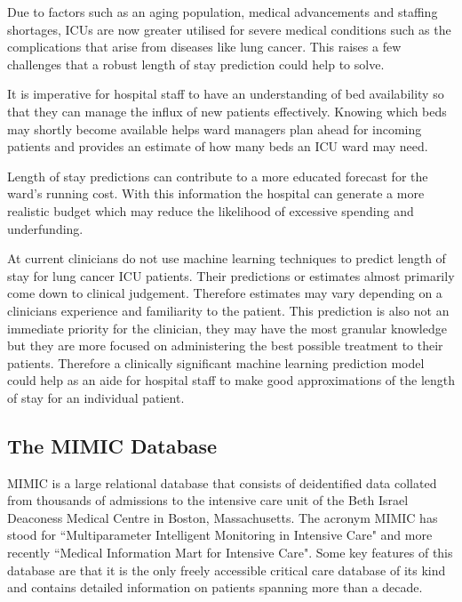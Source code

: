 \documentclass[11pt]{article}
\begin{document}
Due to factors such as an aging population, medical advancements and staffing shortages, ICUs are now greater utilised for severe medical conditions such as the complications that arise from diseases like lung cancer\cite{Halpern2016}. This raises a few challenges that a robust length of stay prediction could help to solve.

It is imperative for hospital staff to have an understanding of bed availability so that they can manage the influx of new patients effectively. Knowing which beds may shortly become available helps ward managers plan ahead for incoming patients and provides an estimate of how many beds an ICU ward may need. 

Length of stay predictions can contribute to a more educated forecast for the ward's running cost. With this information the hospital can generate a more realistic budget which may reduce the likelihood of excessive spending and underfunding.

At current clinicians do not use machine learning techniques to predict length of stay for lung cancer ICU patients. Their predictions or estimates almost primarily come down to clinical judgement. Therefore estimates may vary depending on a clinicians experience and familiarity to the patient. This prediction is also not an immediate priority for the clinician, they may have the most granular knowledge but they are more focused on administering the best possible treatment to their patients. Therefore a clinically significant machine learning prediction model could help as an aide for hospital staff to make good approximations of the length of stay for an individual patient\cite{DosSantos2025}.


\subsection{The MIMIC Database}
MIMIC is a large relational database that consists of deidentified data collated from thousands of admissions to the intensive care unit of the Beth Israel Deaconess Medical Centre in Boston, Massachusetts\cite{physionetMIMICIVV31}. The acronym MIMIC has stood for ``Multiparameter Intelligent Monitoring in Intensive Care" and more recently ``Medical Information Mart for Intensive Care". Some key features of this database are that it is the only freely accessible critical care database of its kind and contains detailed information on patients spanning more than a decade. 
\end{document}
